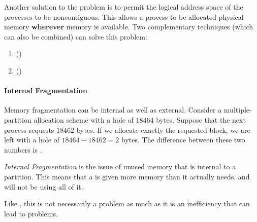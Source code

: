 Another solution to the  problem is to permit the logical address space of the processes to be noncontiguous.
This allows a process to be allocated physical memory \textbf{wherever} memory is available.
Two complementary techniques (which can also be combined) can solve this problem:
\begin{enumerate}[noitemsep]
\item {} ()
\item {} ()
\end{enumerate}

\paragraph{Internal Fragmentation}\label{par:Internal_Fragmentation}
Memory fragmentation can be internal as well as external.
Consider a multiple-partition allocation scheme with a hole of $18464$ bytes.
Suppose that the next process requests $18462$ bytes.
If we allocate exactly the requested block, we are left with a hole of $18464-18462 = 2$ bytes.
The difference between these two numbers is .

\begin{definition}\label{def:Internal_Fragmentation}
  \emph{Internal Fragmentation} is the issue of unused memory that is internal to a partition.
  This means that a  is given more memory than it actually needs, and will not be using all of it.

  Like , this is not necessarily a problem as much as it is an inefficiency that can lead to problems.
\end{definition}


